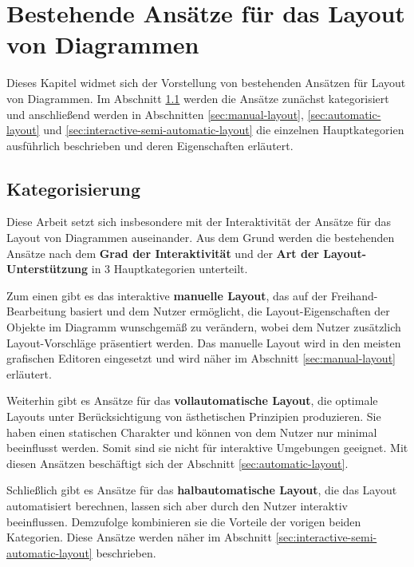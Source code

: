 
\chapter{Bestehende Ansätze für das Layout von Diagrammen}
\label{chapter:existing-approaches}

Dieses Kapitel widmet sich der Vorstellung von bestehenden Ansätzen für Layout von Diagrammen. Im Abschnitt \ref{sec:categorization} werden die Ansätze zunächst kategorisiert und anschließend werden in Abschnitten \ref{sec:manual-layout}, \ref{sec:automatic-layout} und \ref{sec:interactive-semi-automatic-layout} die einzelnen Hauptkategorien ausführlich beschrieben und deren Eigenschaften erläutert.

\section{Kategorisierung}
\label{sec:categorization}

Diese Arbeit setzt sich insbesondere mit der Interaktivität der Ansätze für das Layout von Diagrammen auseinander. Aus dem Grund werden die bestehenden Ansätze nach dem \textbf{Grad der Interaktivität} und der \textbf{Art der Layout-Unterstützung} in 3 Hauptkategorien unterteilt.

Zum einen gibt es das interaktive \textbf{manuelle Layout}, das auf der Freihand-Bearbeitung basiert und dem Nutzer ermöglicht, die Layout-Eigenschaften der Objekte im Diagramm wunschgemäß zu verändern, wobei dem Nutzer zusätzlich Layout-Vorschläge präsentiert werden. Das manuelle Layout wird in den meisten grafischen Editoren eingesetzt und wird näher im Abschnitt \ref{sec:manual-layout} erläutert.

Weiterhin gibt es Ansätze für das \textbf{vollautomatische Layout}, die optimale Layouts unter Berücksichtigung von ästhetischen Prinzipien produzieren. Sie haben einen statischen Charakter und können von dem Nutzer nur minimal beeinflusst werden. Somit sind sie nicht für interaktive Umgebungen geeignet. Mit diesen Ansätzen beschäftigt sich der Abschnitt \ref{sec:automatic-layout}.

Schließlich gibt es Ansätze für das \textbf{halbautomatische Layout}, die das Layout automatisiert berechnen, lassen sich aber durch den Nutzer interaktiv beeinflussen. Demzufolge kombinieren sie die Vorteile der vorigen beiden Kategorien. Diese Ansätze werden näher im Abschnitt \ref{sec:interactive-semi-automatic-layout} beschrieben.

